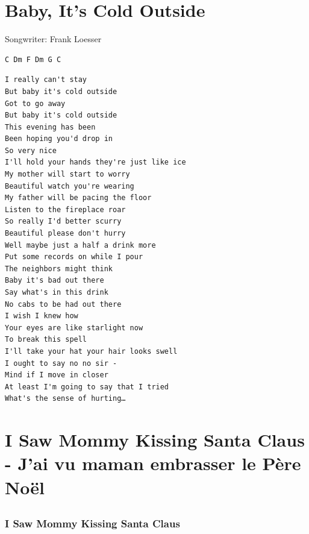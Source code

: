 \documentclass[
]{article}
\begin{document}
\hypertarget{baby-its-cold-outside}{%
\section{Baby, It's Cold Outside}\label{baby-its-cold-outside}}

Songwriter: Frank Loesser

\begin{verbatim}
C Dm F Dm G C 
\end{verbatim}

\begin{verbatim}
I really can't stay
But baby it's cold outside
Got to go away
But baby it's cold outside
This evening has been
Been hoping you'd drop in
So very nice
I'll hold your hands they're just like ice
My mother will start to worry
Beautiful watch you're wearing
My father will be pacing the floor
Listen to the fireplace roar
So really I'd better scurry
Beautiful please don't hurry
Well maybe just a half a drink more
Put some records on while I pour
The neighbors might think
Baby it's bad out there
Say what's in this drink
No cabs to be had out there
I wish I knew how
Your eyes are like starlight now
To break this spell
I'll take your hat your hair looks swell
I ought to say no no sir -
Mind if I move in closer
At least I'm going to say that I tried
What's the sense of hurting…
\end{verbatim}

\hypertarget{i-saw-mommy-kissing-santa-claus---jai-vu-maman-embrasser-le-puxe8re-nouxebl}{%
\section{I Saw Mommy Kissing Santa Claus - J'ai vu maman embrasser le
Père
Noël}\label{i-saw-mommy-kissing-santa-claus---jai-vu-maman-embrasser-le-puxe8re-nouxebl}}

\hypertarget{section-18}{%
\subsection*{}\label{section-18}}

\hypertarget{i-saw-mommy-kissing-santa-claus}{%
\subsubsection*{I Saw Mommy Kissing Santa
Claus}\label{i-saw-mommy-kissing-santa-claus}}
\end{document}
